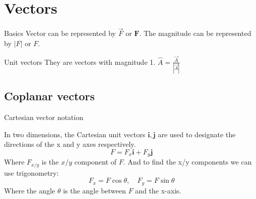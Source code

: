 \documentclass{article}
\begin{document}



\newpage
\tableofcontents
\newpage


\section{Vectors}

\begin{definition}[]{Basics}
    Vector can be represented by $\vec{F}$ or $\boldsymbol{F}$. The magnitude can be represented by $|F|$ or $F$.
\end{definition}

\begin{knBox}[]{Unit vectors}
    They are vectors with magnitude 1. $\hat{A}=\frac{\vec{A}}{|\vec{A}|}$
\end{knBox}

\subsection{Coplanar vectors}
\begin{definition}
    {Cartesian vector notation}

    In two dimensions, the Cartesian unit vectors $\boldsymbol{i}, \boldsymbol{j}$ are used to designate the directions of the x and y axes respectively.
    \[F=F_x \boldsymbol{i} + F_y \boldsymbol{j}\]
    Where $F_{x/y}$ is the $x/y$ component of $F$. And to find the x/y components we can use trigonometry:
    \[F_x=F\cos{\theta},\quad F_y=F\sin{\theta}\]
    Where the angle $\theta$ is the angle between $F$ and the x-axis.
\end{definition}
\end{document}
